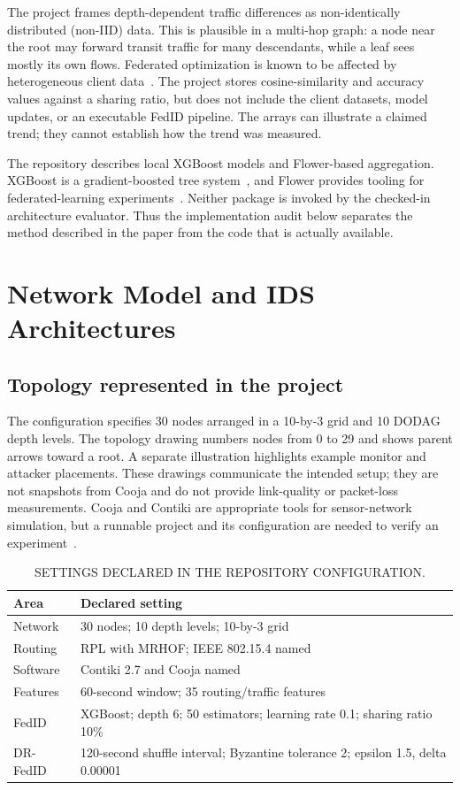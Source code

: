 \documentclass[conference]{IEEEtran}
\begin{document}
The project frames depth-dependent traffic differences as non-identically distributed (non-IID) data. This is plausible in a multi-hop graph: a node near the root may forward transit traffic for many descendants, while a leaf sees mostly its own flows. Federated optimization is known to be affected by heterogeneous client data~\cite{li2020federated}. The project stores cosine-similarity and accuracy values against a sharing ratio, but does not include the client datasets, model updates, or an executable FedID pipeline. The arrays can illustrate a claimed trend; they cannot establish how the trend was measured.

The repository describes local XGBoost models and Flower-based aggregation. XGBoost is a gradient-boosted tree system~\cite{chen2016xgboost}, and Flower provides tooling for federated-learning experiments~\cite{beutel2020flower}. Neither package is invoked by the checked-in architecture evaluator. Thus the implementation audit below separates the method described in the paper from the code that is actually available.

\section{Network Model and IDS Architectures}
\subsection{Topology represented in the project}
The configuration specifies 30 nodes arranged in a 10-by-3 grid and 10 DODAG depth levels. The topology drawing numbers nodes from 0 to 29 and shows parent arrows toward a root. A separate illustration highlights example monitor and attacker placements. These drawings communicate the intended setup; they are not snapshots from Cooja and do not provide link-quality or packet-loss measurements. Cooja and Contiki are appropriate tools for sensor-network simulation, but a runnable project and its configuration are needed to verify an experiment~\cite{osterlind2006cross,dunkels2004contiki}.

\begin{table}[htbp]
\centering
\caption{SETTINGS DECLARED IN THE REPOSITORY CONFIGURATION.}
\label{tab:settings}
\begin{tabular}{p{2.2cm}p{5.6cm}}
\toprule
\textbf{Area} & \textbf{Declared setting} \\
\midrule
Network & 30 nodes; 10 depth levels; 10-by-3 grid \\
Routing & RPL with MRHOF; IEEE 802.15.4 named \\
Software & Contiki 2.7 and Cooja named \\
Features & 60-second window; 35 routing/traffic features \\
FedID & XGBoost; depth 6; 50 estimators; learning rate 0.1; sharing ratio 10\% \\
DR-FedID & 120-second shuffle interval; Byzantine tolerance 2; epsilon 1.5, delta 0.00001 \\
\bottomrule
\end{tabular}
\end{table}
\end{document}
